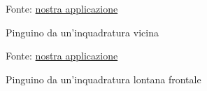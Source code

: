 \documentclass[crop=false, class=book]{standalone}
\begin{document}
	
	\clearpage
	\begin{figure}
			\centering
			{Fonte: \url{nostra applicazione}}
			\caption{Pinguino da un'inquadratura vicina}
			\label{fig: pinguino vicino}
	\end{figure}
	
	\begin{figure}
			\centering
			{Fonte: \url{nostra applicazione}}
			\caption{Pinguino da un'inquadratura lontana frontale}
			\label{fig: pinguino lontano1}
	\end{figure}
	
\end{document}
